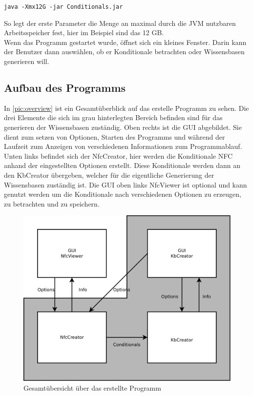 \documentclass[12pt,a4paper]{article}
\begin{document}
\begin{lstlisting}
java -Xmx12G -jar Conditionals.jar 
\end{lstlisting}

So legt der erste Parameter die Menge an maximal durch die JVM nutzbaren Arbeitsspeicher fest, hier im Beispiel sind das 12 GB. \\
Wenn das Programm gestartet wurde, öffnet sich ein kleines Fenster. Darin kann der Benutzer dann  auswählen, ob er Konditionale betrachten oder Wissensbasen generieren will.



\subsection{Aufbau des Programms}
In \autoref{pic:overview} ist ein Gesamtüberblick auf das erstelle Programm zu sehen. Die drei Elemente die sich im grau hinterlegten Bereich befinden sind für das generieren der Wissensbasen zuständig. Oben rechts ist die GUI abgebildet. Sie dient zum setzen von Optionen, Starten des Programms und während der Laufzeit zum Anzeigen von verschiedenen Informationen zum Programmablauf. Unten links befindet sich der NfcCreator, hier werden die Konditionale NFC anhand der eingestellten Optionen erstellt. Diese Konditionale werden dann an den KbCreator übergeben, welcher für die eigentliche Generierung der Wissensbasen zuständig ist.  Die GUI oben links NfcViewer ist optional und kann genutzt werden um die Konditionale nach verschiedenen Optionen zu erzeugen, zu betrachten und zu speichern. %
\begin{figure}
\includegraphics[width=0.7\linewidth]{bilder/overview.png}

\caption{Gesamtübersicht über das erstellte Programm}
\label{pic:overview}
\end{figure}
\end{document}
